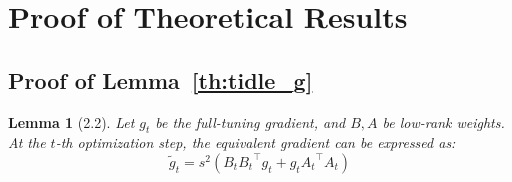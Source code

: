 \section{Proof of Theoretical Results}
\newtheorem*{lemma2}{Lemma}
\newtheorem*{Theorem2}{Theorem}

\subsection{Proof of Lemma~\ref{th:tidle_g}}
\begin{tcolorbox}[colback=gray!20,colframe=gray]
\begin{lemma2}[2.2]
Let \( g_t \) be the full-tuning gradient, and \( B, A \) be low-rank weights. At the \( t \)-th optimization step, the equivalent gradient can be expressed as:
\begin{equation}
    \tilde{g}_t = s^2 \left( B_t {B_t}^\top g_t + g_t {A_t}^\top A_t \right)
\end{equation}
\end{lemma2}
\end{tcolorbox}

